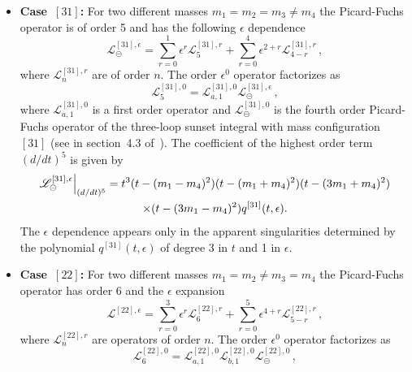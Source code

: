 \documentclass[a4paper,12pt]{article}
\numberwithin{equation}{section}
\numberwithin{figure}{section}
\def\su{\circleddash}
\begin{document}
\begin{itemize}

  \item   {\bf Case~$[31]$:} For two different masses $m_1=m_2=m_3 \neq m_4$ the
  Picard-Fuchs operator is of order 5 and has the following $\epsilon$ dependence
  \begin{equation}
    \mathscr{L}^{[31],\epsilon}_\su=       \sum_{r=0}^1 \epsilon^r
    \mathscr{L}^{[31],r}_{5}+  \sum_{r=0}^4 \epsilon^{2+r}   \mathscr{L}^{[31],r}_{4-r} \, ,
  \end{equation}
  where  $ \mathscr{L}^{[31],r}_{n}$ are of order $n$.
  The order $\epsilon^0$ operator factorizes as
  \begin{equation}
         \mathscr{L}^{[31],0}_{5}=   \mathscr{L}^{[31],0}_{a,1} \mathscr{L}^{[31],\epsilon}_\su \, , 
       \end{equation}
        where  $ \mathscr{L}^{[31],0}_{a,1}$ is a  first order operator
       and $\mathscr{L}^{[31],0}_\su$ is the fourth order
       Picard-Fuchs operator of the
       three-loop sunset integral with mass configuration $[31]$ (see 
       in section~4.3 of~\cite{Lairez:2022zkj}).
       The coefficient of the highest order term $(d/dt)^5$    is given by
       \begin{multline}
                   \mathscr{L}^{[31],\epsilon}_\su\Big\vert_{(d/dt)^5}=
                   t^3  (t-(m_1-m_4)^2)(t-(m_1+m_4)^2)(t-(3m_1+m_4)^2) \cr\times (t-(3m_1-m_4)^2)
            q^{[31]}(t,\epsilon)      .
                 \end{multline}
                 The $\epsilon$ dependence appears only in the
                 apparent singularities determined by the polynomial
                 $q^{[31]}(t,\epsilon)$ of degree 3 in $t$ and 1 in $\epsilon$.
\item   {\bf Case~$[22]$:} For two different masses $m_1=m_2\neq m_3 = m_4$ the
  Picard-Fuchs operator has order 6 and the $\epsilon$ expansion 
  \begin{equation}
    \mathscr{L}^{[22],\epsilon}=     \sum_{r=0}^3 \epsilon^r
    \mathscr{L}^{[22],r}_{6}+  \sum_{r=0}^5 \epsilon^{4+r}   \mathscr{L}^{[22],r}_{5-r} \, ,
  \end{equation}
  where  $ \mathscr{L}^{[22],r}_{n}$ are 
  operators of order $n$.
  The order $\epsilon^0$ operator factorizes as
  \begin{equation}
         \mathscr{L}^{[22],0}_{6}=   \mathscr{L}^{[22],0}_{a,1} \mathscr{L}^{[22],0}_{b,1}\mathscr{L}^{[22],0}_\su \,,
       \end{equation}

\end{itemize}
\end{document}
